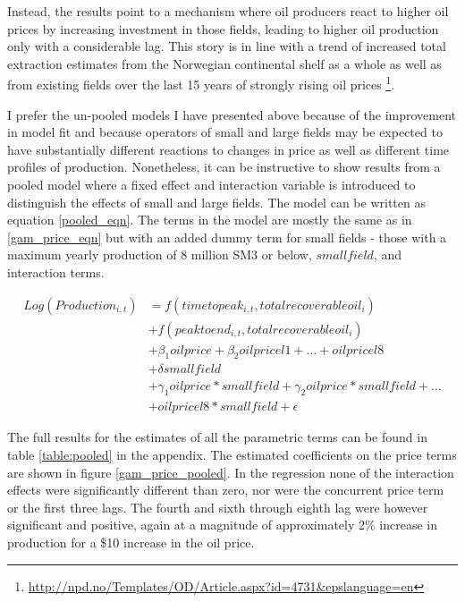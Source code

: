 \documentclass[11pt]{article}
\begin{document}
Instead, the results point to a mechanism where oil producers react to higher oil prices by increasing investment in those fields, leading to higher oil production only with a considerable lag.   This story is in line with a trend of increased total extraction estimates from the Norwegian continental shelf as a whole as well as from existing fields over the last 15 years of strongly rising oil prices \footnote{\url{http://npd.no/Templates/OD/Article.aspx?id=4731&epslanguage=en}}.

I prefer the un-pooled models I have presented above because of the improvement in model fit and because operators of small and large fields may be expected to have substantially different reactions to changes in price as well as different time profiles of production. Nonetheless, it can be instructive to show results from a pooled model where a fixed effect and interaction variable is introduced to distinguish the effects of small and large fields. The model can be written as equation \ref{pooled_eqn}.  The terms in the model are mostly the same as in \ref{gam_price_eqn} but with an added dummy term for small fields - those with a maximum yearly production of 8 million SM3 or below, $smallfield$, and interaction terms.  

\begin{equation}
\begin{split}
	Log(Production_{i,t})&=f(timetopeak_{i,t}, totalrecoverableoil_i) \\
	 \quad & + f(peaktoend_{i,t}, totalrecoverableoil_i) \\
	 \quad & + \beta_1 oilprice + \beta_2 oilpricel1 + \dots + oilpricel8\\
	 \quad & + \delta smallfield \\
 	 \quad & + \gamma_1 oilprice*smallfield + \gamma_2 oilprice*smallfield + \dots \\
 	 \quad & + oilpricel8*smallfield +  \epsilon
\label{pooled_eqn}
\end{split}
\end{equation}

The full results for the estimates of all the parametric terms can be found in table \ref{table:pooled} in the appendix.  The estimated coefficients on the price terms are shown in figure \ref{gam_price_pooled}. In the regression none of the interaction effects were significantly different than zero, nor were the concurrent price term or the first three lags.  The fourth and sixth through eighth lag were however significant and positive, again at a magnitude of approximately 2\% increase in production for a \$10 increase in the oil price.
\end{document}
